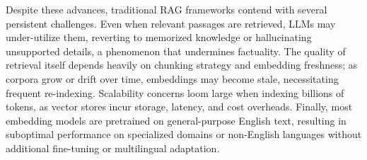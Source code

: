 \documentclass[12pt,twoside]{report}
\begin{document}


Despite these advances, traditional RAG frameworks contend with several persistent challenges. Even when relevant passages are retrieved, LLMs may under-utilize them, reverting to memorized knowledge or hallucinating unsupported details, a phenomenon that undermines factuality. The quality of retrieval itself depends heavily on chunking strategy and embedding freshness; as corpora grow or drift over time, embeddings may become stale, necessitating frequent re-indexing. Scalability concerns loom large when indexing billions of tokens, as vector stores incur storage, latency, and cost overheads. Finally, most embedding models are pretrained on general-purpose English text, resulting in suboptimal performance on specialized domains or non-English languages without additional fine-tuning or multilingual adaptation.
\end{document}
